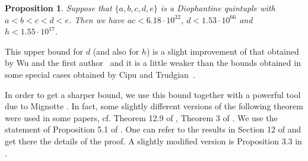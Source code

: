 \documentclass{amsart}
\newtheorem{proposition}{Proposition}
\theoremstyle{definition}
\begin{document}
\begin{proposition}\label{pro:1}
  Suppose that $\{a,b,c,d,e\}$ is a Diophantine quintuple with $a < b < c < d < e$.
  Then we have $ac<6.18\cdot 10^{32}$, $d<1.53\cdot 10^{66}$ and $h<1.55\cdot 10^{17}$.  
\end{proposition}  

This upper bound for $d$ (and also for $h$) is a slight improvement of that obtained by Wu and the first author~\cite{Wu-He:2014}
and it is a little weaker than the bounds obtained in some special cases obtained by Cipu and Trudgian~\cite{Cipu-Trudgian}.

In order to get a sharper bound, we use this bound together with a powerful tool due to Mignotte \cite{Mignotte:kit}.
In fact, some slightly different versions  of the following theorem were used in some papers, cf. Theorem 12.9 of \cite{BMS1},  Theorem 3 of \cite{BMS2}. 
We use the statement of Proposition 5.1 of \cite{Mignotte:kit}. One can refer to the results in Section 12 of \cite{BMS1} and get 
there the details of the proof. A slightly modified version is Proposition 3.3 in \cite{Bennett-Pinter:2006}. 
\end{document}
